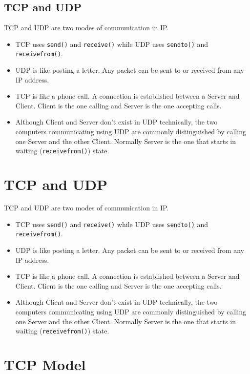 \documentclass[12pt,a4paper]{article}
\begin{document}
\subsection{TCP and UDP}
TCP and UDP are two modes of communication in IP.
\begin{itemize}
\item TCP uses \verb|send()| and \verb|receive()| while UDP uses \verb|sendto()| and \verb|receivefrom()|.
\item UDP is like posting a letter. Any packet can be sent to or received from any IP address. 
\item TCP is like a phone call. A connection is established between a Server and Client. Client is the one calling and Server is the one accepting calls.
\item Although Client and Server don't exist in UDP technically, the two computers communicating using UDP are commonly distinguished by calling one Server and the other Client. Normally Server is the one that starts in waiting (\verb|receivefrom()|) state.
\end{itemize}
\section{TCP and UDP}
TCP and UDP are two modes of communication in IP.
\begin{itemize}
\item TCP uses \verb|send()| and \verb|receive()| while UDP uses \verb|sendto()| and \verb|receivefrom()|.
\item UDP is like posting a letter. Any packet can be sent to or received from any IP address. 
\item TCP is like a phone call. A connection is established between a Server and Client. Client is the one calling and Server is the one accepting calls.
\item Although Client and Server don't exist in UDP technically, the two computers communicating using UDP are commonly distinguished by calling one Server and the other Client. Normally Server is the one that starts in waiting (\verb|receivefrom()|) state.
\end{itemize}
\section{TCP Model}
\end{document}
